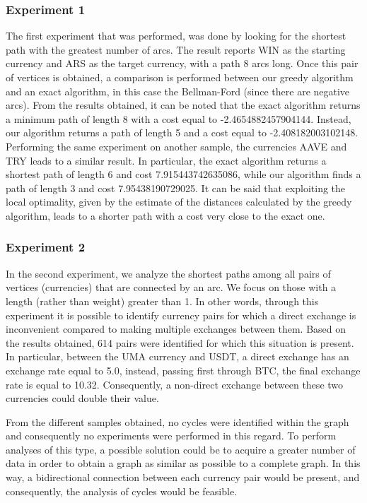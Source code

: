 \subsubsection{Experiment 1}
The first experiment that was performed, was done by looking for the shortest path with the greatest number of arcs. The result reports WIN as the starting currency and ARS as the target currency, with a path 8 arcs long. Once this pair of vertices is obtained, a comparison is performed between our greedy algorithm and an exact algorithm, in this case the Bellman-Ford (since there are negative arcs).
From the results obtained, it can be noted that the exact algorithm returns a minimum path of length 8 with a cost equal to -2.4654882457904144. Instead, our algorithm returns a path of length 5 and a cost equal to -2.408182003102148. 
Performing the same experiment on another sample, the currencies AAVE and TRY leads to a similar result.
In particular, the exact algorithm returns a shortest path of length 6 and cost 7.915443742635086, while our algorithm finds a path of length 3 and cost 7.95438190729025.
It can be said that exploiting the local optimality, given by the estimate of the distances calculated by the greedy algorithm, leads to a shorter path with a cost very close to the exact one.

\subsubsection{Experiment 2}
In the second experiment, we analyze the shortest paths among all pairs of vertices (currencies) that are connected by an arc.
We focus on those with a length (rather than weight) greater than 1.
In other words, through this experiment it is possible to identify currency pairs for which a direct exchange is inconvenient compared to making multiple exchanges between them.
Based on the results obtained, 614 pairs were identified for which this situation is present. In particular, between the UMA currency and USDT, a direct exchange has an exchange rate equal to 5.0, instead, passing first through BTC, the final exchange rate is equal to 10.32. Consequently, a non-direct exchange between these two currencies could double their value.

From the different samples obtained, no cycles were identified within the graph and consequently no experiments were performed in this regard. To perform analyses of this type, a possible solution could be to acquire a greater number of data in order to obtain a graph as similar as possible to a complete graph. In this way, a bidirectional connection between each currency pair would be present, and consequently, the analysis of cycles would be feasible.
